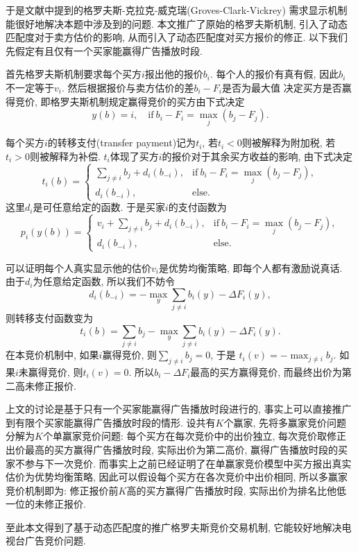 于是文献\citep{Tian}中提到的格罗夫斯-克拉克-威克瑞(Groves-Clark-Vickrey)
需求显示机制能很好地解决本题中涉及到的问题.
本文推广了原始的格罗夫斯机制, 引入了动态匹配度对于卖方估价的影响,
从而引入了动态匹配度对买方报价的修正.
以下我们先假定有且仅有一个买家能赢得广告播放时段.

首先格罗夫斯机制要求每个买方$i$报出他的报价$b_{i}$. 每个人的报价有真有假,
因此$b_{i}$不一定等于$v_{i}$. 然后根据报价与卖方估价的差$b_{i}-F_{i}$是否为最大值
决定买方是否赢得竞价, 即格罗夫斯机制规定赢得竞价的买方由下式决定
\begin{equation}
    y(b) = i, \quad \text{if}\ b_{i}-F_{i} = \max_{j}{(b_{j}-F_{j})}.
\end{equation}

每个买方$i$的转移支付(transfer payment)记为$t_{i}$,
若$t_{i}<0$则被解释为附加税, 若$t_{i}>0$则被解释为补偿.
$t_{i}$体现了买方$i$的报价对于其余买方收益的影响, 由下式决定
\begin{equation}
    t_{i}(b) =
    \begin{cases}
        \displaystyle\sum_{j\neq i}b_{j} + d_{i}(b_{-i}),
        &\text{if}\ b_{i}-F_{i} = \displaystyle\max_{j}{(b_{j}-F_{j})},\\
        d_{i}(b_{-i}), &\text{else}.
    \end{cases}
\end{equation}
这里$d_{i}$是可任意给定的函数. 于是买家$i$的支付函数为
\begin{equation}
    p_{i}(y(b))=
    \begin{cases}
        v_{i}+\displaystyle\sum_{j\neq i}b_{j} + d_{i}(b_{-i}),
        &\text{if}\ b_{i}-F_{i} = \displaystyle\max_{j}{(b_{j}-F_{j})},\\
        d_{i}(b_{-i}), &\text{else}.
    \end{cases}
\end{equation}

可以证明每个人真实显示他的估价$v_{i}$是优势均衡策略, 即每个人都有激励说真话.
由于$d_{i}$为任意给定函数, 所以我们不妨令
\begin{equation}
    d_{i}(b_{-i}) = -\max_{y}{\sum_{j\neq i}{b_{i}(y)-\Delta F_{i}(y)}},
\end{equation}
则转移支付函数变为
\begin{equation}
    t_{i}(b)=\sum_{j\neq i}{b_{j}} - \max_{y}{\sum_{j\neq i}{b_{i}(y)
    -\Delta F_{i}(y)}}.
\end{equation}
在本竞价机制中, 如果$i$赢得竞价, 则$\sum_{j\neq i}{b_{j}}=0$, 于是
$t_{i}(v)=-\max_{j\neq i}{b_{j}}$. 如果$i$未赢得竞价,
则$t_{i}(v)=0$. 所以$b_{i}-\Delta F_{i}$最高的买方赢得竞价,
而最终出价为第二高未修正报价.

上文的讨论是基于只有一个买家能赢得广告播放时段进行的,
事实上可以直接推广到有限个买家能赢得广告播放时段的情形.
设共有$K$个赢家, 先将多赢家竞价问题分解为$K$个单赢家竞价问题:
每个买方在每次竞价中的出价独立, 每次竞价取修正出价最高的买方赢得广告播放时段,
实际出价为第二高价, 赢得广告播放时段的买家不参与下一次竞价.
而事实上之前已经证明了在单赢家竞价模型中买方报出真实估价为优势均衡策略,
因此可以假设每个买方在各次竞价中出价相同, 所以多赢家竞价机制即为:
修正报价前$K$高的买方赢得广告播放时段, 实际出价为排名比他低一位的未修正报价.

至此本文得到了基于动态匹配度的推广格罗夫斯竞价交易机制,
它能较好地解决电视台广告竞价问题.
